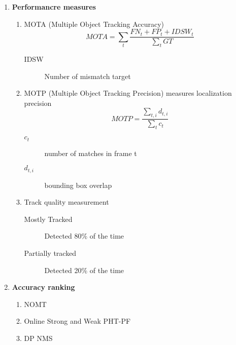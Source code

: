     \begin{enumerate}
        \item \textbf{Performancre measures}
            \begin{enumerate}
                \item MOTA (Multiple Object Tracking Accuracy)
                    \[MOTA = \sum_{t} \frac{FN_t + FP_t + IDSW_t}{\sum_{t} GT}\]
                    \begin{description}
                        \item[IDSW] Number of mismatch target
                    \end{description}
                \item MOTP (Multiple Object Tracking Precision) measures localization precision
                    \[MOTP = \frac{\sum_{t,i} d_{t,i}}{\sum_t c_t}\]
                    \begin{description}
                        \item[$c_t$] number of matches in frame t
                        \item[$d_{t,i}$] bounding box overlap
                    \end{description}
                \item Track quality measurement
                    \begin{description}
                        \item[Mostly Tracked] Detected 80\% of the time
                        \item[Partially tracked] Detected 20\% of the time
                    \end{description}
            \end{enumerate}
        
        \item \textbf{Accuracy ranking}
            \begin{enumerate}
                \item NOMT \cite{choi2015near}
                \item Online Strong and Weak PHT-PF \cite{sanchez2016online}
                \item DP NMS \cite{pirsiavash2011globally}
            \end{enumerate}
    \end{enumerate}